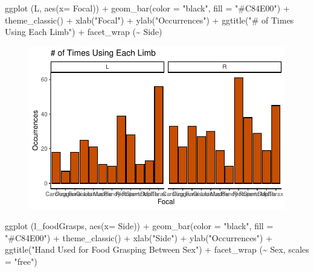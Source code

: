 \documentclass[
  letterpaper,
  DIV=11,
  numbers=noendperiod]{scrartcl}
\newenvironment{Shaded}{\begin{snugshade}}{\end{snugshade}}
\newcommand{\AttributeTok}[1]{\textcolor[rgb]{0.40,0.45,0.13}{#1}}
\newcommand{\FunctionTok}[1]{\textcolor[rgb]{0.28,0.35,0.67}{#1}}
\newcommand{\NormalTok}[1]{\textcolor[rgb]{0.00,0.23,0.31}{#1}}
\newcommand{\SpecialCharTok}[1]{\textcolor[rgb]{0.37,0.37,0.37}{#1}}
\newcommand{\StringTok}[1]{\textcolor[rgb]{0.13,0.47,0.30}{#1}}
\begin{document}
\begin{Shaded}
\begin{Highlighting}[]
\FunctionTok{ggplot}\NormalTok{ (L, }\FunctionTok{aes}\NormalTok{(}\AttributeTok{x=}\NormalTok{ Focal)) }\SpecialCharTok{+}
  \FunctionTok{geom\_bar}\NormalTok{(}\AttributeTok{color =} \StringTok{"black"}\NormalTok{, }\AttributeTok{fill =} \StringTok{"\#C84E00"}\NormalTok{) }\SpecialCharTok{+}
  \FunctionTok{theme\_classic}\NormalTok{() }\SpecialCharTok{+}
  \FunctionTok{xlab}\NormalTok{(}\StringTok{"Focal"}\NormalTok{) }\SpecialCharTok{+}
  \FunctionTok{ylab}\NormalTok{(}\StringTok{"Occurrences"}\NormalTok{) }\SpecialCharTok{+}
  \FunctionTok{ggtitle}\NormalTok{(}\StringTok{"\# of Times Using Each Limb"}\NormalTok{) }\SpecialCharTok{+}
  \FunctionTok{facet\_wrap}\NormalTok{ (}\SpecialCharTok{\textasciitilde{}}\NormalTok{ Side)}
\end{Highlighting}
\end{Shaded}

\begin{figure}[H]

{\centering \includegraphics{LeftyLemurs_files/figure-pdf/unnamed-chunk-38-1.pdf}

}

\end{figure}

\begin{Shaded}
\begin{Highlighting}[]
\FunctionTok{ggplot}\NormalTok{ (l\_foodGrasps, }\FunctionTok{aes}\NormalTok{(}\AttributeTok{x=}\NormalTok{ Side)) }\SpecialCharTok{+}
  \FunctionTok{geom\_bar}\NormalTok{(}\AttributeTok{color =} \StringTok{"black"}\NormalTok{, }\AttributeTok{fill =} \StringTok{"\#C84E00"}\NormalTok{) }\SpecialCharTok{+}
  \FunctionTok{theme\_classic}\NormalTok{() }\SpecialCharTok{+}
  \FunctionTok{xlab}\NormalTok{(}\StringTok{"Side"}\NormalTok{) }\SpecialCharTok{+}
  \FunctionTok{ylab}\NormalTok{(}\StringTok{"Occurrences"}\NormalTok{) }\SpecialCharTok{+}
  \FunctionTok{ggtitle}\NormalTok{(}\StringTok{"Hand Used for Food Grasping Between Sex"}\NormalTok{) }\SpecialCharTok{+}
  \FunctionTok{facet\_wrap}\NormalTok{ (}\SpecialCharTok{\textasciitilde{}}\NormalTok{ Sex, }\AttributeTok{scales =} \StringTok{"free"}\NormalTok{)}
\end{Highlighting}
\end{Shaded}
\end{document}
